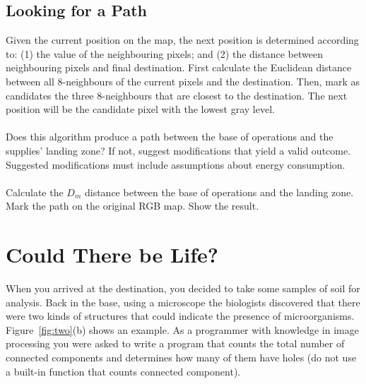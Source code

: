 \documentclass[paper=a4, fontsize=11pt]{scrartcl} %
\numberwithin{equation}{section} %
\numberwithin{figure}{section} %
\numberwithin{table}{section} %
\begin{document}

\subsection{Looking for a Path}

Given the current position on the map, the next position is determined according to: (1) the value of the neighbouring pixels; and (2) the distance between neighbouring pixels and final destination. First calculate the Euclidean distance between all 8-neighbours of the current pixels and the destination. Then, mark as candidates the three 8-neighbours that are closest to the destination. The next position will be the candidate pixel with the lowest gray level.
\\\\
Does this algorithm produce a path between the base of operations and the supplies' landing zone? If not, suggest modifications that yield a valid outcome. Suggested modifications must include assumptions about energy consumption.
\\\\
Calculate the $D_m$ distance between the base of operations and the landing zone. Mark the path on the original RGB map. Show the result.

\section{Could There be Life?}

When you arrived at the destination, you decided to take some samples of soil for analysis. Back in the base, using a microscope the biologists discovered that there were two kinds of structures that could indicate the presence of microorganisms. Figure~\ref{fig:two}(b) shows an example. As a programmer with knowledge in image processing you were asked to write a program that counts the total number of connected components and determines how many of them have holes (do not use a built-in function that counts connected component).


\end{document}

